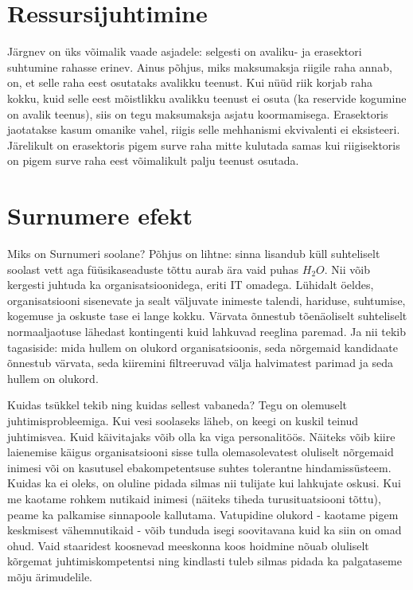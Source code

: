 \section{Ressursijuhtimine}
Järgnev on üks võimalik vaade asjadele: selgesti on avaliku- ja erasektori suhtumine rahasse erinev. Ainus põhjus, miks maksumaksja riigile raha annab, on, et selle raha eest osutataks avalikku teenust. Kui nüüd riik korjab raha kokku, kuid selle eest mõistlikku avalikku teenust ei osuta (ka reservide kogumine on avalik teenus), siis on tegu maksumaksja asjatu koormamisega. Erasektoris jaotatakse kasum omanike vahel, riigis selle mehhanismi ekvivalenti ei eksisteeri. Järelikult on erasektoris pigem surve raha mitte kulutada samas kui riigisektoris on pigem surve raha eest võimalikult palju teenust osutada.  

\section{Surnumere efekt}
Miks on Surnumeri soolane? Põhjus on lihtne: sinna lisandub küll suhteliselt soolast vett aga füüsikaseaduste tõttu aurab ära  vaid puhas $H_2O$. Nii võib kergesti juhtuda ka organisatsioonidega, eriti IT omadega. Lühidalt öeldes, organisatsiooni sisenevate ja sealt väljuvate inimeste talendi, hariduse, suhtumise, kogemuse ja oskuste tase ei lange kokku. Värvata õnnestub tõenäoliselt suhteliselt normaaljaotuse lähedast kontingenti kuid lahkuvad reeglina paremad. Ja nii tekib tagasiside: mida hullem on olukord organisatsioonis, seda nõrgemaid kandidaate õnnestub värvata, seda kiiremini filtreeruvad välja halvimatest parimad ja seda hullem on olukord. 

Kuidas tsükkel tekib ning kuidas sellest vabaneda? Tegu on olemuselt juhtimisprobleemiga. Kui vesi soolaseks läheb, on keegi on kuskil teinud juhtimisvea. Kuid käivitajaks võib olla ka viga personalitöös. Näiteks võib kiire laienemise käigus organisatsiooni sisse tulla olemasolevatest oluliselt nõrgemaid inimesi või on kasutusel ebakompetentsuse suhtes tolerantne hindamissüsteem. Kuidas ka ei oleks, on oluline pidada silmas nii tulijate kui lahkujate oskusi. Kui me kaotame rohkem nutikaid inimesi (näiteks tiheda turusituatsiooni tõttu), peame ka palkamise sinnapoole kallutama. Vatupidine olukord - kaotame pigem keskmisest vähemnutikaid - võib tunduda isegi soovitavana kuid ka siin on omad ohud. Vaid staaridest koosnevad meeskonna koos hoidmine nõuab oluliselt kõrgemat juhtimiskompetentsi ning kindlasti tuleb silmas pidada ka palgataseme mõju ärimudelile.


